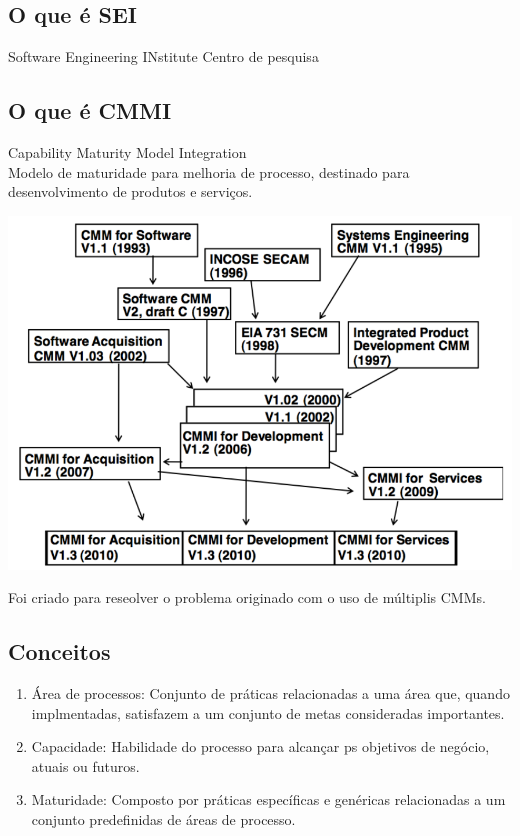 \documentclass{article}
\begin{document}
\subsection{O que é SEI}
	Software Engineering INstitute \newline
	Centro de pesquisa

\subsection{O que é CMMI} 	
	Capability Maturity Model Integration \\
	Modelo de maturidade para melhoria de processo, destinado para desenvolvimento de produtos e serviços. \\
	\begin{center}
		\includegraphics[scale=0.35]{historico_cmmi} \\
	\end{center}
	Foi criado para reseolver o problema originado com o uso de múltiplis CMMs.

\subsection{Conceitos}

\begin{enumerate}
\item Área de processos: Conjunto de práticas relacionadas a uma área que, quando implmentadas, satisfazem a um conjunto de metas consideradas importantes.
\item Capacidade: Habilidade do processo para alcançar ps objetivos de negócio, atuais ou futuros.
\item Maturidade: Composto por práticas específicas e genéricas relacionadas a um conjunto predefinidas de áreas de processo.
\end{enumerate}
\end{document}
